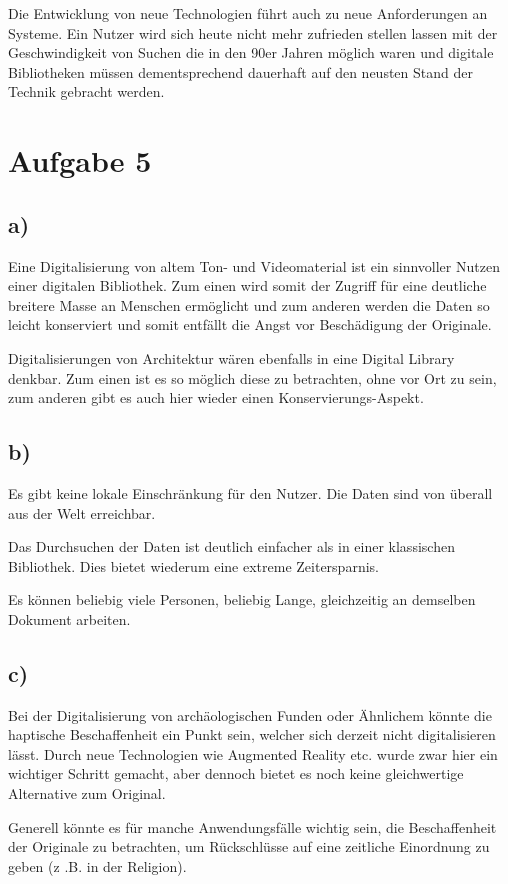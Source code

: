 \documentclass[11pt,a4paper,parskip=half ]{scrartcl}
\begin{document}
		Die Entwicklung von neue Technologien führt auch zu neue Anforderungen an Systeme. Ein Nutzer wird sich heute nicht mehr zufrieden stellen lassen mit der Geschwindigkeit von Suchen die in den 90er Jahren möglich waren und digitale Bibliotheken müssen dementsprechend dauerhaft auf den neusten Stand der Technik gebracht werden.

	\section*{Aufgabe 5}
	\subsection*{a)}
	Eine Digitalisierung von altem Ton- und Videomaterial ist ein sinnvoller Nutzen einer digitalen Bibliothek. Zum einen wird somit der Zugriff für eine deutliche breitere Masse an Menschen ermöglicht und zum anderen werden die Daten so leicht konserviert und somit entfällt die Angst vor Beschädigung der Originale. 
	
	Digitalisierungen von Architektur wären ebenfalls in eine Digital Library denkbar. Zum einen ist es so möglich diese zu betrachten, ohne vor Ort zu sein, zum anderen gibt es auch hier wieder einen Konservierungs-Aspekt.
		
	\subsection*{b)}
	Es gibt keine lokale Einschränkung für den Nutzer. Die Daten sind von überall aus der Welt erreichbar.
	
	Das Durchsuchen der Daten ist deutlich einfacher als in einer klassischen Bibliothek. Dies bietet wiederum eine extreme Zeitersparnis. 
	
	Es können beliebig viele Personen, beliebig Lange, gleichzeitig an demselben Dokument arbeiten. 
	
	\subsection*{c)}
	Bei der Digitalisierung von archäologischen Funden oder Ähnlichem könnte die haptische Beschaffenheit ein Punkt sein, welcher sich derzeit nicht digitalisieren lässt. Durch neue Technologien wie Augmented Reality etc. wurde zwar hier ein wichtiger Schritt gemacht, aber dennoch bietet es noch keine gleichwertige Alternative zum Original. 
	
	Generell könnte es für manche Anwendungsfälle wichtig sein, die Beschaffenheit der Originale zu betrachten, um Rückschlüsse auf eine zeitliche Einordnung zu geben (z .B. in der Religion).
	
	
\end{document}
